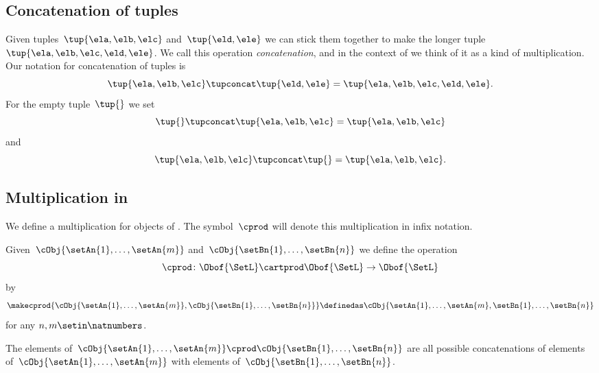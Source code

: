 \subsection{Concatenation of tuples}

Given tuples~$\tup{\ela, \elb, \elc}$ and~$\tup{\eld, \ele}$ we can stick them together to make the longer tuple~$\tup{\ela, \elb, \elc, \eld, \ele}$.
We call this operation \emph{concatenation}, and in the context of \SetL we think of it as a kind of multiplication.
Our notation for concatenation of tuples is
\begin{equation}
    \tup{\ela, \elb, \elc} \tupconcat \tup{\eld, \ele} = \tup{\ela, \elb, \elc, \eld, \ele}.
\end{equation}
For the empty tuple~$\tup{  }$ we set
\begin{equation}
    \tup{} \tupconcat \tup{\ela, \elb, \elc}  = \tup{\ela, \elb, \elc}
\end{equation}
and
\begin{equation}
    \tup{\ela, \elb, \elc}  \tupconcat \tup{ } = \tup{\ela, \elb, \elc}.
\end{equation}

\subsection{Multiplication in \SetL}

We define a multiplication for objects of \SetL.
The symbol~$\cprod$ will denote this multiplication in infix notation.

Given~$\cObj{\setAn{1}, \ldots, \setAn{m}}$ and~$\cObj{\setBn{1}, \ldots, \setBn{n}}$ we define the operation
\begin{equation}
    \cprod \colon \Obof{\SetL} \cartprod \Obof{\SetL} \to \Obof{\SetL}
\end{equation}
by
\begin{equation}
    \label{eq:strict-monoidal-product-sets}
    \makecprod{
        \cObj{\setAn{1}, \ldots, \setAn{m}},
        \cObj{\setBn{1}, \ldots, \setBn{n}}
    } \definedas \cObj{\setAn{1}, \ldots, \setAn{m}, \setBn{1},  \ldots, \setBn{n}}
\end{equation}
for any $n, m \setin \natnumbers$.

The elements of~$\cObj{\setAn{1}, \ldots, \setAn{m}} \cprod \cObj{\setBn{1}, \ldots, \setBn{n}}$ are all possible concatenations of elements of~$\cObj{\setAn{1}, \ldots, \setAn{m}}$ with elements of~$\cObj{\setBn{1}, \ldots, \setBn{n}}$.

